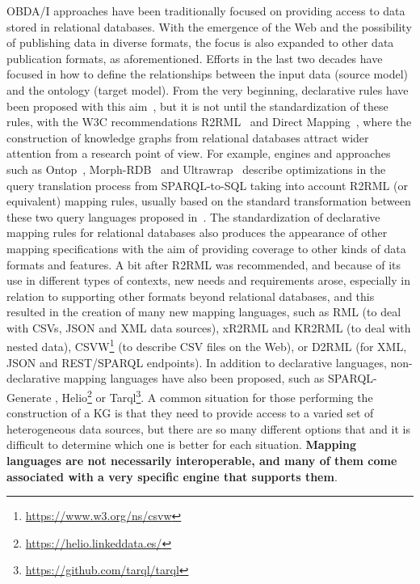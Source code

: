 OBDA/I approaches have been traditionally focused on providing access to data stored in relational databases. With the emergence of the Web and the possibility of publishing data in diverse formats, the focus is also expanded to other data publication formats, as aforementioned. Efforts in the last two decades have focused in how to define the relationships between the input data (source model) and the ontology (target model). From the very beginning, declarative rules have been proposed with this aim~\citep{barrasa2004r2o,bizer2004d2rq,auer2009triplify}, but it is not until the standardization of these rules, with the W3C recommendations R2RML~\citep{R2RML} and Direct Mapping~\citep{arenas2013direct}, where the construction of knowledge graphs from relational databases attract wider attention from a research point of view. For example, engines and approaches such as Ontop~\citep{calvanese2017ontop}, Morph-RDB~\citep{priyatna2014formalisation} and Ultrawrap~\citep{sequeda2013ultrawrap} describe optimizations in the query translation process from SPARQL-to-SQL taking into account R2RML (or equivalent) mapping rules, usually based on the standard transformation between these two query languages proposed in~\citep{chebotko2009semantics, elliott2009complete}. The standardization of declarative mapping rules for relational databases also produces the appearance of other mapping specifications with the aim of providing coverage to other kinds of data formats and features. A bit after R2RML was recommended, and because of its use in different types of contexts, new needs and requirements arose, especially in relation to supporting other formats beyond relational databases, and this resulted in the creation of many new mapping languages, such as RML \citep{dimou2014rml} (to deal with CSVs, JSON and XML data sources), xR2RML \citep{michel2015translation} and  KR2RML \citep{slepicka2015kr2rml} (to deal with nested data), CSVW\footnote{\url{https://www.w3.org/ns/csvw}} (to describe CSV files on the Web), or D2RML \citep{chortaras2018d2rml} (for XML, JSON and REST/SPARQL endpoints). In addition to declarative languages, non-declarative mapping languages have also been proposed, such as SPARQL-Generate \citep{lefranccois2017sparql}, Helio\footnote{\url{https://helio.linkeddata.es/}} or  Tarql\footnote{\url{https://github.com/tarql/tarql}}. A common situation for those performing the construction of a KG is that they need to provide access to a varied set of heterogeneous data sources, but there are so many different options that and it is difficult to determine which one is better for each situation. \textbf{Mapping languages are not necessarily interoperable, and many of them come associated with a very specific engine that supports them}.

